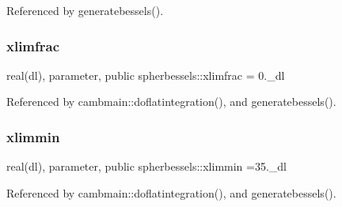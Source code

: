 Referenced by generatebessels().

\mbox{\label{namespacespherbessels_a07d278e5f2a51b79893a106358cb1afc}} 
\subsubsection{\texorpdfstring{xlimfrac}{xlimfrac}}
{\footnotesize\ttfamily real(dl), parameter, public spherbessels\+::xlimfrac = 0.\+\_\+dl}



Referenced by cambmain\+::doflatintegration(), and generatebessels().

\mbox{\label{namespacespherbessels_a7609b1d2bbb03aefd6c6f47a69538eed}} 
\subsubsection{\texorpdfstring{xlimmin}{xlimmin}}
{\footnotesize\ttfamily real(dl), parameter, public spherbessels\+::xlimmin =35.\+\_\+dl}



Referenced by cambmain\+::doflatintegration(), and generatebessels().

